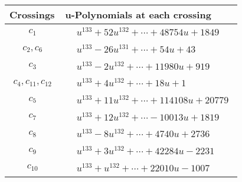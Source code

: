 \documentclass[1p]{elsarticle_modified}
\theoremstyle{definition}
\begin{document}
\begin{tabular}{m{50pt}|m{274pt}}
Crossings & \hspace{64pt}u-Polynomials at each crossing \\
\hline $$\begin{aligned}c_{1}\end{aligned}$$&$\begin{aligned}
&u^{133}+52 u^{132}+\cdots+48754 u+1849
\end{aligned}$\\
\hline $$\begin{aligned}c_{2},c_{6}\end{aligned}$$&$\begin{aligned}
&u^{133}-26 u^{131}+\cdots+54 u+43
\end{aligned}$\\
\hline $$\begin{aligned}c_{3}\end{aligned}$$&$\begin{aligned}
&u^{133}-2 u^{132}+\cdots+11980 u+919
\end{aligned}$\\
\hline $$\begin{aligned}c_{4},c_{11},c_{12}\end{aligned}$$&$\begin{aligned}
&u^{133}+4 u^{132}+\cdots+18 u+1
\end{aligned}$\\
\hline $$\begin{aligned}c_{5}\end{aligned}$$&$\begin{aligned}
&u^{133}+11 u^{132}+\cdots+114108 u+20779
\end{aligned}$\\
\hline $$\begin{aligned}c_{7}\end{aligned}$$&$\begin{aligned}
&u^{133}+12 u^{132}+\cdots-10013 u+1819
\end{aligned}$\\
\hline $$\begin{aligned}c_{8}\end{aligned}$$&$\begin{aligned}
&u^{133}-8 u^{132}+\cdots+4740 u+2736
\end{aligned}$\\
\hline $$\begin{aligned}c_{9}\end{aligned}$$&$\begin{aligned}
&u^{133}+3 u^{132}+\cdots+42284 u-2231
\end{aligned}$\\
\hline $$\begin{aligned}c_{10}\end{aligned}$$&$\begin{aligned}
&u^{133}+u^{132}+\cdots+22010 u-1007
\end{aligned}$\\
\hline
\end{tabular}\\~\\
\end{document}
